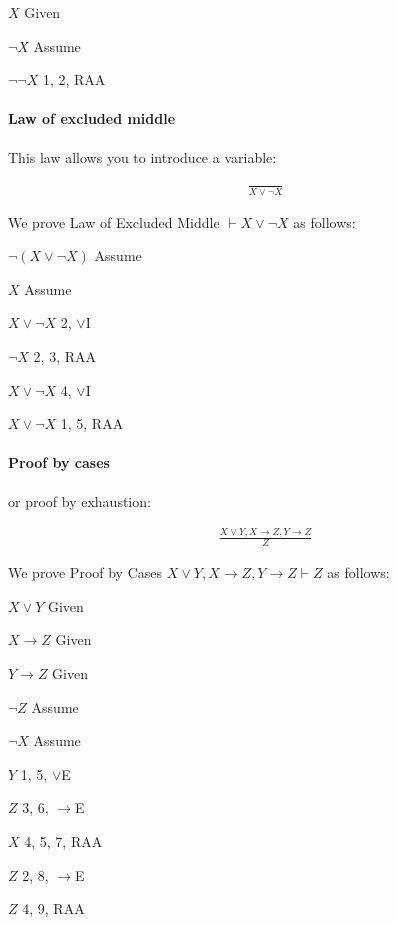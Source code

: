 \documentclass{article}
\newcommand{\indentitem}{\addtolength\itemindent{20pt}}
\theoremstyle{plain}
\theoremstyle{definition}
\begin{document}
\begin{multicols}{2}
\begin{enumerate}
\item $X$ \hfill Given
{\indentitem
\item $\lnot X$ \hfill Assume
}
\item $\lnot\lnot X$ \hfill 1, 2, RAA
\end{enumerate}

\paragraph{Law of excluded middle} This law allows you to introduce a variable:

\begin{align*}
 &\frac{}{X \lor \lnot X}
\end{align*}  

\noindent We prove Law of Excluded Middle $\vdash X \lor \lnot X$ as follows:

\begin{enumerate}
{\indentitem
\item $\lnot (X \lor \lnot X)$ \hfill Assume
{\indentitem
\item $X$ \hfill Assume
\item $X \lor \lnot X$ \hfill 2, $\lor$I
}
\item $\lnot X$ \hfill 2, 3, RAA
\item $X \lor \lnot X$ \hfill 4, $\lor$I
}
\item $X \lor \lnot X$ \hfill 1, 5, RAA
\end{enumerate}

\paragraph{Proof by cases} or proof by exhaustion:

\begin{align*}
 &\frac{X \lor Y, X \rightarrow Z, Y \rightarrow Z}{Z}
\end{align*}  

\noindent We prove Proof by Cases $X \lor Y, X \rightarrow Z, Y \rightarrow Z \vdash Z$ as follows:

\begin{enumerate}
\item $X \lor Y$ \hfill Given
\item $X \rightarrow Z$ \hfill Given
\item $Y \rightarrow Z$ \hfill Given
{\indentitem
\item $\lnot Z$ \hfill Assume
{\indentitem
\item $\lnot X$ \hfill Assume
\item $Y$ \hfill 1, 5, $\lor$E
\item $Z$ \hfill 3, 6, $\rightarrow$E
}
\item $X$ \hfill 4, 5, 7, RAA
\item $Z$ \hfill 2, 8, $\rightarrow$E
}
\item $Z$ \hfill 4, 9, RAA
\end{enumerate}


\end{multicols}
\end{document}
